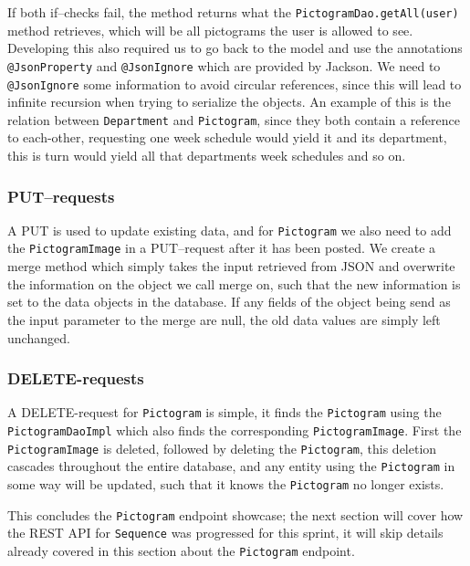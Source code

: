 If both if--checks fail, the method returns what the \texttt{PictogramDao.getAll(user)} method retrieves, which will be all pictograms the user is allowed to see.
Developing this also required us to go back to the model and use the annotations \texttt{@JsonProperty} and \texttt{@JsonIgnore} which are provided by Jackson.
We need to \texttt{@JsonIgnore} some information to avoid circular references, since this will lead to infinite recursion when trying to serialize the objects.
An example of this is the relation between \texttt{Department} and \texttt{Pictogram}, since they both contain a reference to each-other, requesting one week schedule would yield it and its department, this is turn would yield all that departments week schedules and so on.

\subsubsection*{PUT--requests}
A PUT is used to update existing data, and for \texttt{Pictogram} we also need to add the \texttt{PictogramImage} in a PUT--request after it has been posted.
We create a merge method which simply takes the input retrieved from JSON and overwrite the information on the object we call merge on, such that the new information is set to the data objects in the database.
If any fields of the object being send as the input parameter to the merge are null, the old data values are simply left unchanged.

\subsubsection*{DELETE-requests}
A DELETE-request for \texttt{Pictogram} is simple, it finds the \texttt{Pictogram} using the \texttt{PictogramDaoImpl} which also finds the corresponding \texttt{PictogramImage}.
First the \texttt{PictogramImage} is deleted, followed by deleting the \texttt{Pictogram}, this deletion cascades throughout the entire database, and any entity using the \texttt{Pictogram} in some way will be updated, such that it knows the \texttt{Pictogram} no longer exists.

This concludes the \texttt{Pictogram} endpoint showcase; the next section will cover how the REST API for \texttt{Sequence} was progressed for this sprint, it will skip details already covered in this section about the \texttt{Pictogram} endpoint.